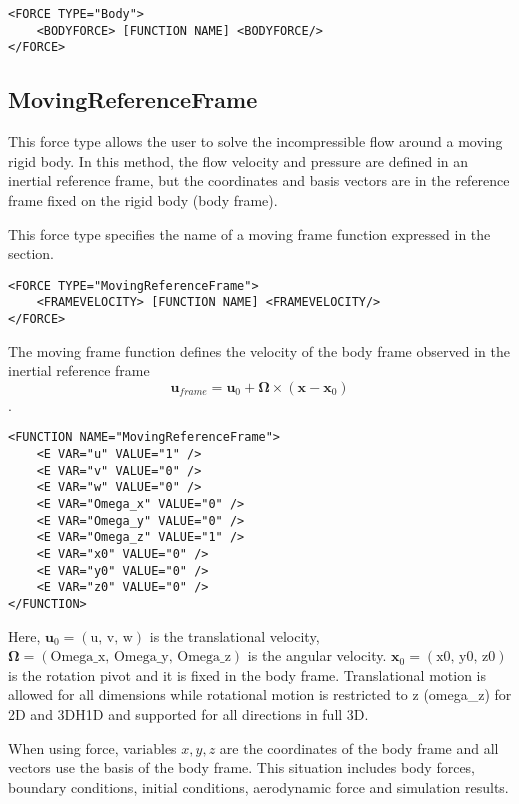 \begin{lstlisting}[style=XMLStyle] 
<FORCE TYPE="Body">
    <BODYFORCE> [FUNCTION NAME] <BODYFORCE/>
</FORCE>
\end{lstlisting}

\subsection{MovingReferenceFrame}
This force type allows the user to solve the incompressible flow around a moving rigid body. In this method, the flow velocity and pressure are defined in an inertial reference frame, but the coordinates and basis vectors are in the reference frame fixed on the rigid body (body frame).

This force type specifies the name of a moving frame function expressed in the  section.

\begin{lstlisting}[style=XMLStyle]
<FORCE TYPE="MovingReferenceFrame">
    <FRAMEVELOCITY> [FUNCTION NAME] <FRAMEVELOCITY/>
</FORCE>
\end{lstlisting}

The moving frame function defines the velocity of the body frame observed in the inertial reference frame $$\mathbf{u}_{frame} = \mathbf{u}_0 + \mathbf{\Omega}\times (\mathbf{x}-\mathbf{x}_0)$$.

\begin{lstlisting}[style=XMLStyle]
<FUNCTION NAME="MovingReferenceFrame">
    <E VAR="u" VALUE="1" />
    <E VAR="v" VALUE="0" />
    <E VAR="w" VALUE="0" />
    <E VAR="Omega_x" VALUE="0" />
    <E VAR="Omega_y" VALUE="0" />
    <E VAR="Omega_z" VALUE="1" />
    <E VAR="x0" VALUE="0" />
    <E VAR="y0" VALUE="0" />
    <E VAR="z0" VALUE="0" />
</FUNCTION>
\end{lstlisting}
Here, $\mathbf{u}_0 = (\text{u, v, w})$ is the translational velocity, $\mathbf{\Omega}=(\text{Omega\_x, Omega\_y, Omega\_z})$ is the angular velocity.
$\mathbf{x}_0=(\text{x0, y0, z0})$ is the rotation pivot and it is fixed in the body frame.
Translational motion is allowed for all dimensions while rotational motion is restricted to z (omega\_z) for 2D and 3DH1D and supported for all directions in full 3D.

When using  force, variables $x, y ,z$ are the coordinates of the body frame and all vectors use the basis of the body frame. This situation includes body forces, boundary conditions, initial conditions, aerodynamic force and simulation results.

